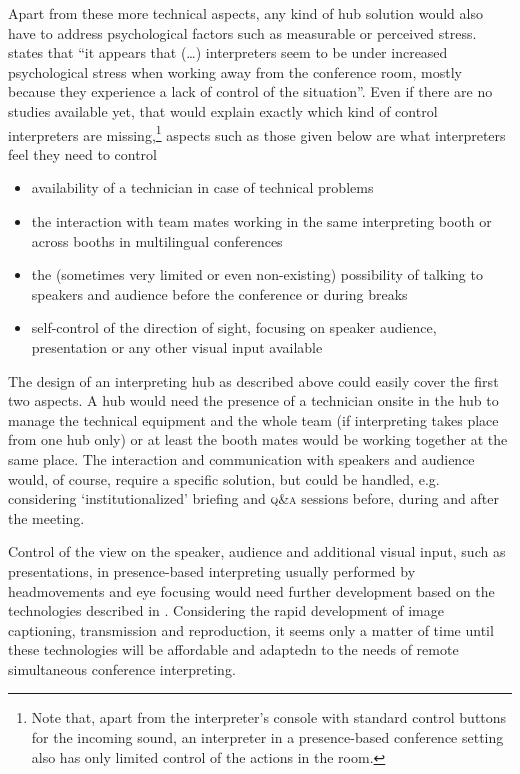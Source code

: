 \documentclass[output=paper]{langsci/langscibook}
\begin{document}
\largerpage
Apart from these more technical aspects, any kind of hub solution would also have to address psychological factors such as measurable or perceived stress. \citet[15]{Moser-Mercer2005} states that “it appears that (…) interpreters seem to be under increased psychological stress when working away from the conference room, mostly because they experience a lack of control of the situation”. Even if there are no studies available yet, that would explain exactly which kind of control interpreters are missing,\footnote{Note that, apart from the interpreter’s console with standard control buttons for the incoming sound, an interpreter in a presence-based conference setting also has only limited control of the actions in the room.} aspects such as those given below are what interpreters feel they need to control

\begin{itemize}
\item availability of a technician in case of technical problems
\item the interaction with team mates working in the same interpreting booth or across booths in multilingual conferences
\item the (sometimes very limited or even non-existing) possibility of talking to speakers and audience before the conference or during breaks
\item self-control of the direction of sight, focusing on speaker audience, presentation or any other visual input available
\end{itemize}


The design of an interpreting hub as described above could easily cover the first two aspects. A hub would need the presence of a technician onsite in the hub to manage the technical equipment and the whole team (if interpreting takes place from one hub only) or at least the booth mates would be working together at the same place. 
The interaction and communication with speakers and audience would, of course, require a specific solution, but could be handled, e.g. considering ‘institutionalized’ briefing and \textsc{q\&a} sessions before, during and after the meeting.

Control of the view on the speaker, audience and additional visual input, such as presentations, in presence-based interpreting usually performed by head\linebreak movements and eye focusing would need further development based on the technologies described in . Considering the rapid development of image captioning, transmission and reproduction, it seems only a matter of time until these technologies will be affordable and adaptedn to the needs of remote simultaneous conference interpreting. 
\end{document}
